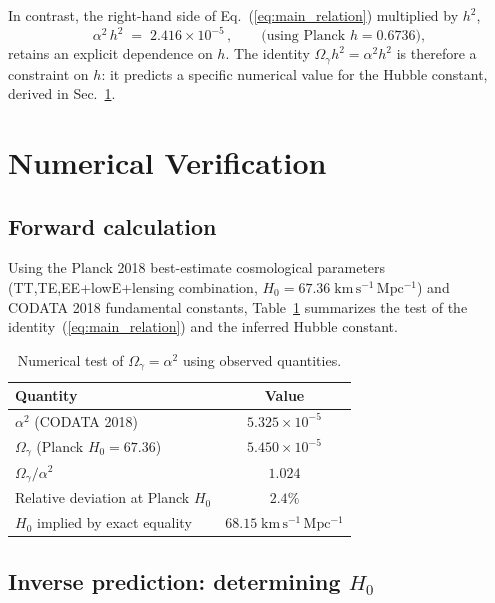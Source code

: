 \documentclass[12pt, a4paper]{article}
\begin{document}
In contrast, the right-hand side of Eq.~(\ref{eq:main_relation}) multiplied by $h^2$,
\begin{equation}
    \alpha^2\,h^2 \;=\; 2.416\times 10^{-5}\,,\qquad \text{(using Planck $h = 0.6736$)},
\label{eq:alpha2_h2}
\end{equation}
retains an explicit dependence on $h$. The identity $\Omega_\gamma h^2 = \alpha^2 h^2$ is therefore a constraint on $h$: it predicts a specific numerical value for the Hubble constant, derived in Sec.~\ref{sec:numerical}.

\newpage
\section{Numerical Verification}
\label{sec:numerical}

\subsection{Forward calculation}
\label{sec:forward}

Using the Planck 2018 best-estimate cosmological parameters~\cite{planck_2018} (TT,TE,EE+lowE+lensing combination, $H_0 = 67.36\;\mathrm{km\,s^{-1}\,Mpc^{-1}}$) and CODATA 2018 fundamental constants, Table~\ref{tab:forward} summarizes the test of the identity~(\ref{eq:main_relation}) and the inferred Hubble constant.

\begin{table}[H]
\centering
\caption{Numerical test of $\Omega_\gamma = \alpha^2$ using observed quantities.}
\label{tab:forward}
\begin{tabular}{lc}
\toprule
Quantity & Value \\
\midrule
$\alpha^2$ (CODATA 2018) & $5.325 \times 10^{-5}$ \\
$\Omega_\gamma$ (Planck $H_0 = 67.36$) & $5.450 \times 10^{-5}$ \\
$\Omega_\gamma / \alpha^2$ & $1.024$ \\
Relative deviation at Planck $H_0$ & $2.4\%$ \\
$H_0$ implied by exact equality & $68.15\;\mathrm{km\,s^{-1}\,Mpc^{-1}}$ \\
\bottomrule
\end{tabular}
\end{table}

\subsection{Inverse prediction: determining \texorpdfstring{$H_0$}{H0}}
\label{sec:inverse}
\end{document}
